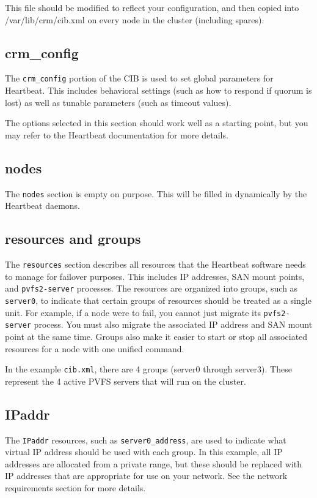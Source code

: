 \documentclass[11pt]{article}
\begin{document}
This file should be modified to reflect your configuration, and then
copied into /var/lib/crm/cib.xml on every node in the cluster (including
spares).

\subsection{crm\_config}

The \texttt{crm\_config} portion of the CIB is used to set global
parameters for Heartbeat.  This includes behavioral settings
(such as how to respond if quorum is lost) as well as tunable parameters
(such as timeout values).

The options selected in this section should work well as a starting
point, but you may refer to the Heartbeat documentation for more
details.

\subsection{nodes}

The \texttt{nodes} section is empty on purpose.  This will be filled in
dynamically by the Heartbeat daemons.

\subsection{resources and groups}

The \texttt{resources} section describes all resources that the
Heartbeat software needs to manage for failover purposes.  This includes
IP addresses, SAN mount points, and \texttt{pvfs2-server} processes.  The
resources are organized into groups, such as \texttt{server0}, to
indicate that certain groups of resources should be treated as a single
unit.  For example, if a node were to fail, you cannot just migrate its
\texttt{pvfs2-server} process.  You must also migrate the associated IP address
and SAN mount point at the same time.  Groups also make it easier to
start or stop all associated resources for a node with one unified command.

In the example \texttt{cib.xml}, there are 4 groups (server0 through
server3).  These represent the 4 active PVFS servers that will run on
the cluster.

\subsection{IPaddr}

The \texttt{IPaddr} resources, such as \texttt{server0\_address}, are
used to indicate what virtual IP address should be used with each group.
In this example, all IP addresses are allocated from a private range, but
these should be replaced with IP addresses that are appropriate for use
on your network.  See the network requirements section for more details.
\end{document}

